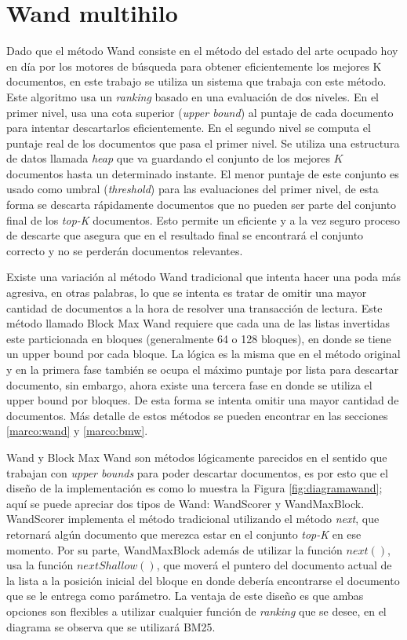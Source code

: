 \chapter{Wand multihilo}
\label{cap:wand}
Dado que el método Wand \citep{Broder:2003} consiste en el método del estado del arte ocupado hoy en día por los motores de búsqueda para obtener eficientemente los mejores K documentos, en este trabajo se utiliza un sistema que trabaja con este método. Este algoritmo usa un \textit{ranking} basado en una evaluación de dos niveles. En el primer nivel, usa una cota superior (\textit{upper bound}) al puntaje de cada documento para intentar descartarlos eficientemente. En el segundo nivel se computa el puntaje real de los documentos que pasa el primer nivel. Se utiliza una estructura de datos llamada \textit{heap} que va guardando el conjunto de los mejores $K$ documentos hasta un determinado instante. El menor puntaje de este conjunto es usado como umbral (\textit{threshold}) para las evaluaciones del primer nivel, de esta forma se descarta rápidamente documentos que no pueden ser parte del conjunto final de los \textit{top-K} documentos. Esto permite un eficiente y a la vez seguro proceso de descarte que asegura que en el resultado final se encontrará el conjunto correcto y no se perderán documentos relevantes.

Existe una variación al método Wand tradicional que intenta hacer una poda más agresiva, en otras palabras, lo que se intenta es tratar de omitir una mayor cantidad de documentos a la hora de resolver una transacción de lectura. Este método llamado Block Max Wand requiere que cada una de las listas invertidas este particionada en bloques (generalmente 64 o 128 bloques), en donde se tiene un upper bound por cada bloque. La lógica es la misma que en el método original y en la primera fase también se ocupa el máximo puntaje por lista para descartar documento, sin embargo, ahora existe una tercera fase en donde se utiliza el upper bound por bloques. De esta forma se intenta omitir una mayor cantidad de documentos. Más detalle de estos métodos se pueden encontrar en las secciones \ref{marco:wand} y \ref{marco:bmw}.

Wand y Block Max Wand son métodos lógicamente parecidos en el sentido que trabajan con \textit{upper bounds} para poder descartar documentos, es por esto que el diseño de la implementación es como lo muestra la Figura \ref{fig:diagramawand}; aquí se puede apreciar dos tipos de Wand: WandScorer y WandMaxBlock. WandScorer implementa el método tradicional utilizando el método \textit{next}, que retornará algún documento que merezca estar en el conjunto \textit{top-K} en ese momento. Por su parte, WandMaxBlock además de utilizar la función \textit{$next()$}, usa la función \textit{$nextShallow()$}, que moverá el puntero del documento actual de la lista a la posición inicial del bloque en donde debería encontrarse el documento que se le entrega como parámetro. 
La ventaja de este diseño es que ambas opciones son flexibles a utilizar cualquier función de \textit{ranking} que se desee, en el diagrama se observa que se utilizará BM25.

